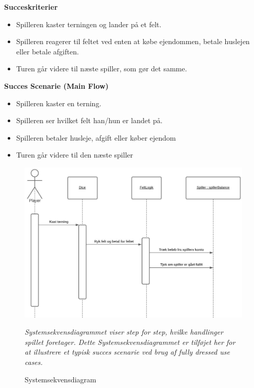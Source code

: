         \textbf{Succeskriterier} 
        \begin{itemize}
            \item Spilleren kaster terningen og lander på et felt.
            \item Spilleren reagerer til feltet ved enten at købe ejendommen, betale huslejen eller betale afgiften. 
            \item Turen går videre til næste spiller, som gør det samme. 
        \end{itemize}
        
        \bigskip
        
        \textbf{Succes Scenarie (Main Flow)}
        \begin{itemize}
            \item Spilleren kaster en terning.
            \item Spilleren ser hvilket felt han/hun er landet på.
            \item Spilleren betaler husleje, afgift eller køber ejendom
            \item Turen går videre til den næste spiller
        \end{itemize}
        
        \begin{figure}[H]
            \centering
            \includegraphics[width=14cm]{figures/systemSekvensDiagram.JPG}
            \caption{Systemsekvensdiagram}
            \emph{Systemsekvensdiagrammet viser step for step, hvilke handlinger spillet foretager. Dette Systemsekvensdiagrammet er tilføjet her for at illustrere et typisk succes scenarie ved brug af fully dressed use cases.}
        \end{figure}
        
